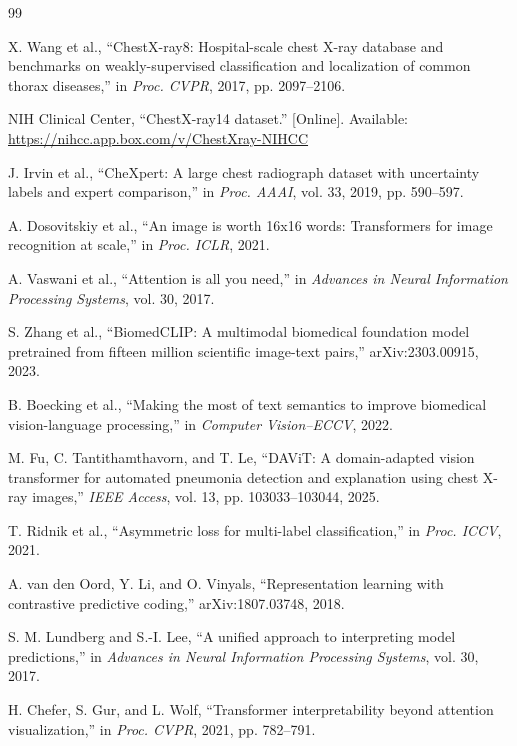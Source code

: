 \documentclass[conference,letterpaper]{IEEEtran}
\begin{document}
\begin{thebibliography}{99}

X. Wang et al., ``ChestX-ray8: Hospital-scale chest X-ray database and benchmarks on weakly-supervised classification and localization of common thorax diseases,'' in \emph{Proc. CVPR}, 2017, pp. 2097--2106.

NIH Clinical Center, ``ChestX-ray14 dataset.'' [Online]. Available: \url{https://nihcc.app.box.com/v/ChestXray-NIHCC}

J. Irvin et al., ``CheXpert: A large chest radiograph dataset with uncertainty labels and expert comparison,'' in \emph{Proc. AAAI}, vol. 33, 2019, pp. 590--597.

A. Dosovitskiy et al., ``An image is worth 16x16 words: Transformers for image recognition at scale,'' in \emph{Proc. ICLR}, 2021.

A. Vaswani et al., ``Attention is all you need,'' in \emph{Advances in Neural Information Processing Systems}, vol. 30, 2017.

S. Zhang et al., ``BiomedCLIP: A multimodal biomedical foundation model pretrained from fifteen million scientific image-text pairs,'' arXiv:2303.00915, 2023.

B. Boecking et al., ``Making the most of text semantics to improve biomedical vision-language processing,'' in \emph{Computer Vision--ECCV}, 2022.

M. Fu, C. Tantithamthavorn, and T. Le, ``DAViT: A domain-adapted vision transformer for automated pneumonia detection and explanation using chest X-ray images,'' \emph{IEEE Access}, vol. 13, pp. 103033--103044, 2025.

T. Ridnik et al., ``Asymmetric loss for multi-label classification,'' in \emph{Proc. ICCV}, 2021.

A. van den Oord, Y. Li, and O. Vinyals, ``Representation learning with contrastive predictive coding,'' arXiv:1807.03748, 2018.

S. M. Lundberg and S.-I. Lee, ``A unified approach to interpreting model predictions,'' in \emph{Advances in Neural Information Processing Systems}, vol. 30, 2017.

H. Chefer, S. Gur, and L. Wolf, ``Transformer interpretability beyond attention visualization,'' in \emph{Proc. CVPR}, 2021, pp. 782--791.

\end{thebibliography}
\end{document}
